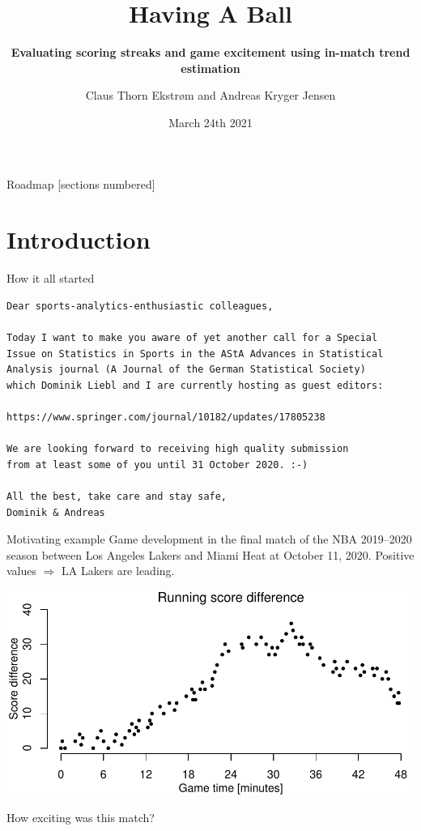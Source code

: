 \documentclass[ignorenonframetext,xcolor=pdflatex,table,dvipsnames,serif]{beamer}
\title{{\tiny \faBasketballBall} {\scriptsize \faBasketballBall} {\small \faBasketballBall} {\faBasketballBall} {\LARGE \faBasketballBall} {\huge \faBasketballBall} Having A Ball {\huge \faBasketballBall} {\LARGE \faBasketballBall} {\faBasketballBall} {\small \faBasketballBall} {\scriptsize \faBasketballBall} {\tiny \faBasketballBall}}
\subtitle{\textbf{Evaluating scoring streaks and game excitement using in-match trend estimation}}
\date{March 24th 2021}
\author{Claus Thorn Ekstrøm and Andreas Kryger Jensen}
\institute{Biostatistics, Department of Public Health\\ University of Copenhagen}
\begin{document}
\frame[plain]{\titlepage}
 
\begin{frame}{Roadmap}
  [sections numbered]
  \tableofcontents[hideallsubsections]
\end{frame}
 

\section{Introduction}

\begin{frame}[fragile]{How it all started}
\begin{Verbatim}[fontsize=\footnotesize]
Dear sports-analytics-enthusiastic colleagues,

Today I want to make you aware of yet another call for a Special 
Issue on Statistics in Sports in the AStA Advances in Statistical 
Analysis journal (A Journal of the German Statistical Society) 
which Dominik Liebl and I are currently hosting as guest editors:

https://www.springer.com/journal/10182/updates/17805238

We are looking forward to receiving high quality submission 
from at least some of you until 31 October 2020. :-)

All the best, take care and stay safe,
Dominik & Andreas	
\end{Verbatim}
\end{frame}

\begin{frame}{Motivating example}
Game development in the final match of the NBA 2019–2020 season between Los Angeles Lakers and Miami Heat at October 11, 2020. Positive values $\Rightarrow$ LA Lakers are leading.

\includegraphics[scale=0.7]{fig1.pdf}

How exciting was this match?
\end{frame}
\end{document}
